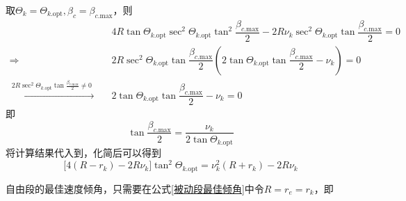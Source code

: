 取$\varTheta_k = \varTheta_{k\text{.opt}}, \beta_c = \beta_{c\text{.max}}$，则
\begin{align*}
	& 4 R \tan \varTheta_{k\text{.opt}} \sec^2\varTheta_{k\text{.opt}} \tan^2 \dfrac{\beta_{c\text{.max}}}{2} - 2 R \nu_k \sec^2 \varTheta_{k\text{.opt}} \tan \dfrac{\beta_{c\text{.max}}}{2} = 0 \\
	\Longrightarrow \quad & 2R\sec^2 \varTheta_{k\text{.opt}} \tan \dfrac{\beta_{c\text{.max}}}{2} \left(2 \tan \varTheta_{k\text{.opt}} \tan \dfrac{\beta_{c\text{.max}}}{2} - \nu_k\right) = 0 \\
	\xrightarrow{ \,\, \textstyle 2R\sec^2 \varTheta_{k\text{.opt}} \tan \frac{\textstyle \beta_{c\text{.max}}}{\textstyle 2} \neq 0 \,\, } \quad & 2 \tan \varTheta_{k\text{.opt}} \tan \dfrac{\beta_{c\text{.max}}}{2} - \nu_k = 0
\end{align*}
即
\begin{equation}
	\tan \dfrac{\beta_{c\text{.max}}}{2} = \dfrac{\nu_k}{2 \tan \varTheta_{k\text{.opt}}}
\end{equation}
将计算结果代入到\peref[命中方程]，化简后可以得到
\begin{equation}
	\big[4(R - r_k) - 2 R \nu_k\big] \tan^2 \varTheta_{k\text{.opt}} = \nu_k^2 (R + r_k) - 2 R \nu_k
\end{equation}


自由段的最佳速度倾角，只需要在公式\eqref{被动段最佳倾角}中令$R = r_e = r_k$，即
 

